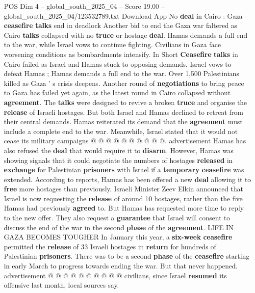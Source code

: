 \begin{textsample}{POS Dim 4 – global\_south\_2025\_04 – Score 19.00 – global\_south\_2025\_04/123532789.txt}  \label{ex:f4_pos_248}
Download App No \textbf{deal} in Cairo : Gaza \textbf{ceasefire} \textbf{talks} end in deadlock Another bid to end the Gaza war faltered as Cairo \textbf{talks} collapsed with no \textbf{truce} or hostage \textbf{deal}.
Hamas demands a full end to the war, while Israel vows to continue fighting.
Civilians in Gaza face worsening conditions as bombardments intensify.
In Short \textbf{Ceasefire} \textbf{talks} in Cairo failed as Israel and Hamas stuck to opposing demands.
Israel vows to defeat Hamas ; Hamas demands a full end to the war.
Over 1,500 Palestinians killed as Gaza ' s crisis deepens.
Another round of \textbf{negotiations} to bring peace to Gaza has failed yet again, as the latest round in Cairo collapsed without \textbf{agreement}.
The \textbf{talks} were designed to revive a broken \textbf{truce} and organise the \textbf{release} of Israeli hostages.
But both Israel and Hamas declined to retreat from their central demands.
Hamas reiterated its demand that the \textbf{agreement} must include a complete end to the war.
Meanwhile, Israel stated that it would not cease its military campaigns @ @ @ @ @ @ @ @ @ @. advertisement Hamas has also refused the \textbf{deal} that would require it to \textbf{disarm}.
However, Hamas was showing signals that it could negotiate the numbers of hostages \textbf{released} in \textbf{exchange} for Palestinian \textbf{prisoners} with Israel if a \textbf{temporary} \textbf{ceasefire} was extended.
According to reports, Hamas has been offered a new \textbf{deal} allowing it to \textbf{free} more hostages than previously.
Israeli Minister Zeev Elkin announced that Israel is now requesting the \textbf{release} of around 10 hostages, rather than the five Hamas had previously \textbf{agreed} to.
But Hamas has requested more time to reply to the new offer.
They also request a \textbf{guarantee} that Israel will consent to discuss the end of the war in the second \textbf{phase} of the \textbf{agreement}.
LIFE IN GAZA BECOMES TOUGHER In January this year, a \textbf{six-week} \textbf{ceasefire} permitted the \textbf{release} of 33 Israeli hostages in \textbf{return} for hundreds of Palestinian \textbf{prisoners}.
There was to be a second \textbf{phase} of the \textbf{ceasefire} starting in early March to progress towards ending the war.
But that never happened. advertisement @ @ @ @ @ @ @ @ @ @ civilians, since Israel \textbf{resumed} its offensive last month, local sources say.

\end{textsample}
